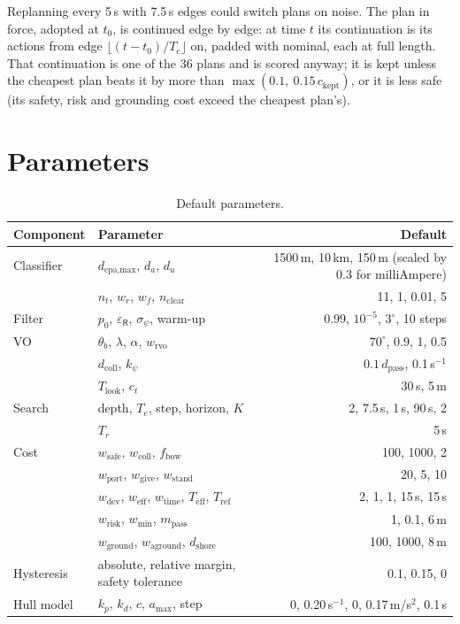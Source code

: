\documentclass[10pt,a4paper]{article}
\newcommand{\R}{\mathsf{R}}
\begin{document}
Replanning every 5\,s with 7.5\,s edges could
switch plans on noise. The plan in force, adopted at $t_0$, is continued edge by
edge: at time $t$ its continuation is its actions from edge $\lfloor
(t-t_0)/T_e\rfloor$ on, padded with nominal, each at full length. That
continuation is one of the 36 plans and is scored anyway; it is kept unless the
cheapest plan beats it by more than $\max(0.1,\ 0.15\,c_{\text{kept}})$, or it
is less safe (its safety, risk and grounding cost exceed the cheapest plan's).




\appendix
\section{Parameters}\label{app:params}

\begin{table}[h]
\centering\small
\caption{Default parameters.}
\label{tab:params}
\begin{tabular}{@{}llr@{}}
\toprule
Component & Parameter & Default \\
\midrule
Classifier & $d_{\text{cpa,max}}$, $d_a$, $d_u$ & 1500\,m, 10\,km, 150\,m (scaled by 0.3 for milliAmpere) \\
           & $n_t$, $w_r$, $w_f$, $n_{\text{clear}}$ & 11, 1, 0.01, 5 \\
Filter     & $p_0$, $\varepsilon_\R$, $\sigma_\psi$, warm-up & 0.99, $10^{-5}$, $3^\circ$, 10 steps \\
VO         & $\theta_b$, $\lambda$, $\alpha$, $w_{\text{rvo}}$ & $70^\circ$, 0.9, 1, 0.5 \\
           & $d_{\text{coll}}$, $k_\psi$ & $0.1\,d_{\text{pass}}$, 0.1\,s$^{-1}$ \\
           & $T_{\text{look}}$, $c_t$ & 30\,s, 5\,m \\
Search     & depth, $T_e$, step, horizon, $K$ & 2, 7.5\,s, 1\,s, 90\,s, 2 \\
           & $T_r$ & 5\,s \\
Cost       & $w_{\text{safe}}$, $w_{\text{coll}}$, $f_{\text{bow}}$ & 100, 1000, 2 \\
           & $w_{\text{port}}$, $w_{\text{give}}$, $w_{\text{stand}}$ & 20, 5, 10 \\
           & $w_{\text{dev}}$, $w_{\text{eff}}$, $w_{\text{time}}$, $T_{\text{eff}}$, $T_{\text{ref}}$ & 2, 1, 1, 15\,s, 15\,s \\
           & $w_{\text{risk}}$, $w_{\min}$, $m_{\text{pass}}$ & 1, 0.1, 6\,m \\
           & $w_{\text{ground}}$, $w_{\text{aground}}$, $d_{\text{shore}}$ & 100, 1000, 8\,m \\
Hysteresis & absolute, relative margin, safety tolerance & 0.1, 0.15, 0 \\
Hull model & $k_p$, $k_d$, $c$, $a_{\max}$, step & 0, 0.20\,s$^{-1}$, 0, 0.17\,m/s$^2$, 0.1\,s \\
\bottomrule
\end{tabular}
\end{table}
\end{document}
